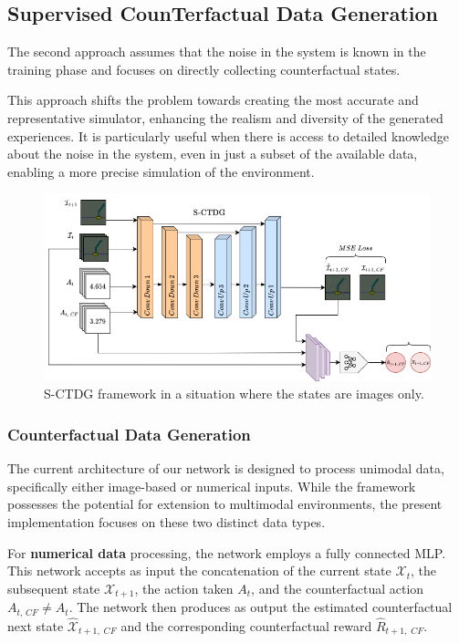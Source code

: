 \subsection{Supervised CounTerfactual Data Generation}
\label{sec:sctdg}

The second approach assumes that the noise in the system is known
in the training phase and focuses on directly collecting
counterfactual states.

This approach shifts the problem towards creating the most
accurate and representative simulator, enhancing the
realism and diversity of the generated experiences.
It is particularly useful when there is access to detailed
knowledge about the noise in the system,
even in just a subset of the available data, enabling a more
precise simulation of the environment.

\begin{figure}[ht]
    \centering
    \includegraphics[width=\textwidth]{figures/ch4/2.sctdg.png}
    \caption{S-CTDG framework in a situation where the states are
    images only.}
    \label{fig:sctdg}
\end{figure}

\subsubsection{Counterfactual Data Generation}

The current architecture of our network is designed to process unimodal data,
specifically either image-based or numerical inputs.
While the framework possesses the potential for extension
to multimodal environments, the present implementation focuses
on these two distinct data types.

For \textbf{numerical data} processing, the network employs a fully connected MLP.
This network accepts as input the concatenation of the current state
$\mathcal{X}_{t}$, the subsequent state $\mathcal{X}_{t+1}$,
the action taken $A_t$, and the counterfactual action $A_{t,\, CF} \neq A_t$.
The network then produces as output the estimated counterfactual next state
$\hat{\mathcal{X}}_{t+1,\; CF}$ and the corresponding counterfactual
reward $\hat{R}_{t+1,\; CF}$.

